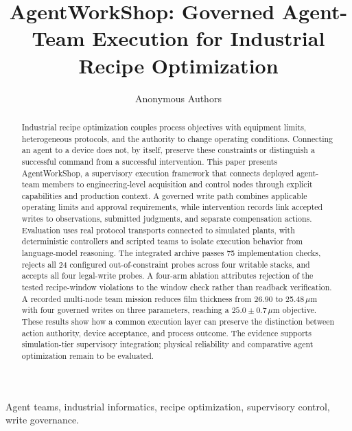 \documentclass[journal]{IEEEtran}
\begin{document}
\title{AgentWorkShop: Governed Agent-Team Execution for Industrial Recipe Optimization}

\author{Anonymous Authors}

\maketitle

\begin{abstract}
Industrial recipe optimization couples process objectives with equipment limits,
heterogeneous protocols, and the authority to change operating conditions.
Connecting an agent to a device does not, by itself, preserve these constraints
or distinguish a successful command from a successful intervention. This paper
presents AgentWorkShop, a supervisory execution framework that connects deployed
agent-team members to engineering-level acquisition and control nodes through
explicit capabilities and production context. A governed write path combines
applicable operating limits and approval requirements, while intervention
records link accepted writes to observations, submitted judgments, and separate
compensation actions. Evaluation uses real protocol transports connected to
simulated plants, with deterministic controllers and scripted teams to isolate
execution behavior from language-model reasoning. The integrated archive passes
75 implementation checks, rejects all 24 configured out-of-constraint probes
across four writable stacks, and accepts all four legal-write probes. A
four-arm ablation attributes rejection of the tested recipe-window violations
to the window check rather than readback verification. A recorded multi-node team
mission reduces film thickness from 26.90 to 25.48\,$\mu$m with four governed
writes on three parameters, reaching a $25.0\pm0.7\,\mu$m objective. These results
show how a common execution layer can preserve the distinction between action
authority, device acceptance, and process outcome. The evidence supports
simulation-tier supervisory integration; physical reliability and comparative
agent optimization remain to be evaluated.
\end{abstract}

\begin{IEEEkeywords}
Agent teams, industrial informatics, recipe optimization, supervisory control, write governance.
\end{IEEEkeywords}

\IEEEpeerreviewmaketitle





\FloatBarrier





\end{document}
